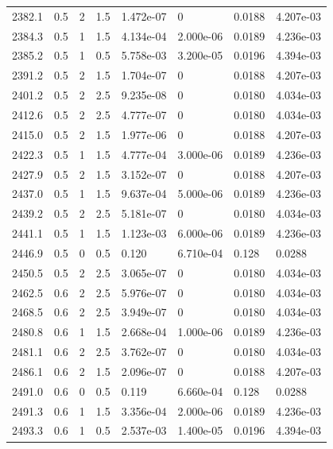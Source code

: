 \documentclass[preview]{standalone}
\begin{document}
{{{{{{{{\begin{tabular}{L{1.2cm}C{1.2cm} C{0.3cm}C{0.5cm} C{1.4cm}C{1.4cm} C{1.4cm}C{1.4cm}}
  2382.1  &   0.5  & 2     & 1.5 &  1.472e-07  & 0  & 0.0188 &  4.207e-03   \\ 
  2384.3  &   0.5  & 1     & 1.5 &  4.134e-04  & 2.000e-06  & 0.0189 &  4.236e-03   \\ 
  2385.2  &   0.5  & 1     & 0.5 &  5.758e-03  & 3.200e-05  & 0.0196 &  4.394e-03   \\ 
  2391.2  &   0.5  & 2     & 1.5 &  1.704e-07  & 0  & 0.0188 &  4.207e-03   \\ 
  2401.2  &   0.5  & 2     & 2.5 &  9.235e-08  & 0  & 0.0180 &  4.034e-03   \\ 
  2412.6  &   0.5  & 2     & 2.5 &  4.777e-07  & 0  & 0.0180 &  4.034e-03   \\ 
  2415.0  &   0.5  & 2     & 1.5 &  1.977e-06  & 0  & 0.0188 &  4.207e-03   \\ 
  2422.3  &   0.5  & 1     & 1.5 &  4.777e-04  & 3.000e-06  & 0.0189 &  4.236e-03   \\ 
  2427.9  &   0.5  & 2     & 1.5 &  3.152e-07  & 0  & 0.0188 &  4.207e-03   \\ 
  2437.0  &   0.5  & 1     & 1.5 &  9.637e-04  & 5.000e-06  & 0.0189 &  4.236e-03   \\ 
  2439.2  &   0.5  & 2     & 2.5 &  5.181e-07  & 0  & 0.0180 &  4.034e-03   \\ 
  2441.1  &   0.5  & 1     & 1.5 &  1.123e-03  & 6.000e-06  & 0.0189 &  4.236e-03   \\ 
  2446.9  &   0.5  & 0     & 0.5 &  0.120  & 6.710e-04  & 0.128 &  0.0288   \\ 
  2450.5  &   0.5  & 2     & 2.5 &  3.065e-07  & 0  & 0.0180 &  4.034e-03   \\ 
  2462.5  &   0.6  & 2     & 2.5 &  5.976e-07  & 0  & 0.0180 &  4.034e-03   \\ 
  2468.5  &   0.6  & 2     & 2.5 &  3.949e-07  & 0  & 0.0180 &  4.034e-03   \\ 
  2480.8  &   0.6  & 1     & 1.5 &  2.668e-04  & 1.000e-06  & 0.0189 &  4.236e-03   \\ 
  2481.1  &   0.6  & 2     & 2.5 &  3.762e-07  & 0  & 0.0180 &  4.034e-03   \\ 
  2486.1  &   0.6  & 2     & 1.5 &  2.096e-07  & 0  & 0.0188 &  4.207e-03   \\ 
  2491.0  &   0.6  & 0     & 0.5 &  0.119  & 6.660e-04  & 0.128 &  0.0288   \\ 
  2491.3  &   0.6  & 1     & 1.5 &  3.356e-04  & 2.000e-06  & 0.0189 &  4.236e-03   \\ 
  2493.3  &   0.6  & 1     & 0.5 &  2.537e-03  & 1.400e-05  & 0.0196 &  4.394e-03   \\ 

\end{tabular}}}}}}}}}
\end{document}
